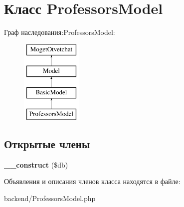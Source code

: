 \hypertarget{classProfessorsModel}{}\section{Класс Professors\+Model}
\label{classProfessorsModel}
Граф наследования\+:Professors\+Model\+:\begin{figure}[H]
\begin{center}
\leavevmode
\includegraphics[height=4.000000cm]{classProfessorsModel}
\end{center}
\end{figure}
\subsection*{Открытые члены}
\begin{DoxyCompactItemize}
\item 
\hypertarget{classProfessorsModel_a9407334912449fea657c4df215748518}{}{\bfseries \+\_\+\+\_\+construct} (\$db)\label{classProfessorsModel_a9407334912449fea657c4df215748518}

\end{DoxyCompactItemize}


Объявления и описания членов класса находятся в файле\+:\begin{DoxyCompactItemize}
\item 
backend/Professors\+Model.\+php\end{DoxyCompactItemize}
